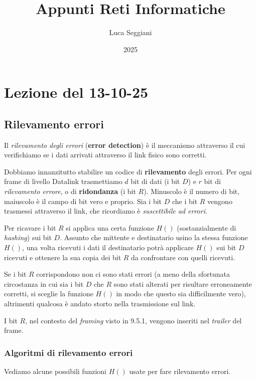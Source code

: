 \documentclass[a4paper,11pt]{article}
\title{Appunti Reti Informatiche}
\author{Luca Seggiani}
\date{2025}
\begin{document}
\section{Lezione del 13-10-25}

\thispagestyle{empty}
\pagestyle{fancy}

\subsection{Rilevamento errori}
Il \textit{rilevamento degli errori} (\textbf{error detection}) è il meccanismo attraverso il cui verifichiamo se i dati arrivati attraverso il link fisico sono corretti.

Dobbiamo innanzitutto stabilire un codice di \textbf{rilevamento} degli errori.
Per ogni frame di livello Datalink trasmettiamo $d$ bit di dati (i bit $D$) e $r$ bit di \textit{rilevamento errore}, o di \textbf{ridondanza} (i bit $R$). Minuscolo è il numero di bit, maiuscolo è il campo di bit vero e proprio.
Sia i bit $D$ che i bit $R$ vengono trasmessi attraverso il link, che ricordiamo è \textit{suscettibile ad errori}.

Per ricavare i bit $R$ si applica una certa funzione $H()$ (sostanzialmente di \textit{hashing}) sui bit $D$. Assunto che mittente e destinatario usino la stessa funzione $H()$, una volta ricevuti i dati il destinatario potrà applicare $H()$ sui bit $D$ ricevuti e ottenere la sua copia dei bit $R$ da confrontare con quelli ricevuti.

Se i bit $R$ corrispondono non ci sono stati errori (a meno della sfortunata circostanza in cui sia i bit $D$ che $R$ sono stati alterati per risultare erroneamente corretti, si sceglie la funzione $H()$ in modo che questo sia difficilmente vero), altrimenti qualcosa è andato storto nella trasmissione sul link.

I bit $R$, nel contesto del \textit{framing} visto in 9.5.1, vengono inseriti nel \textit{trailer} del frame.

\subsubsection{Algoritmi di rilevamento errori}
Vediamo alcune possibili funzioni $H()$ usate per fare rilevamento errori.
\end{document}
